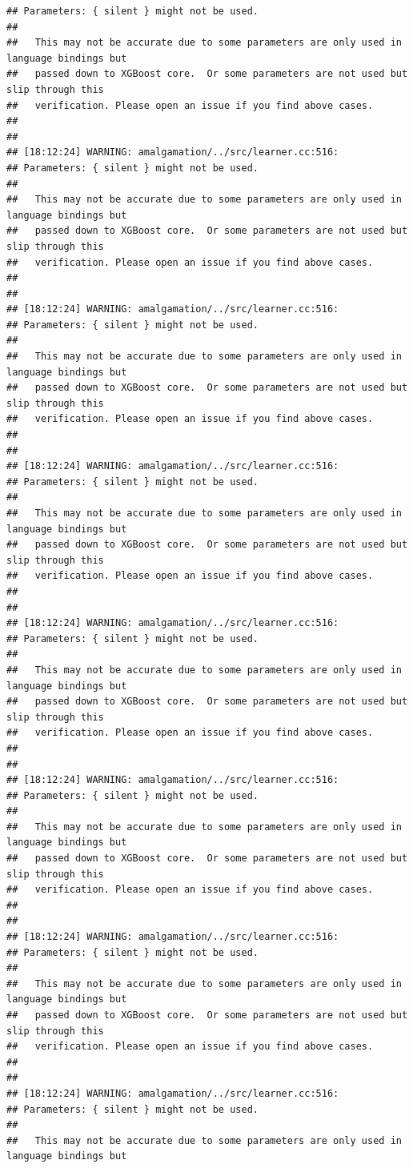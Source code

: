 \documentclass[AMS,STIX2COL]{WileyNJD-v2}\usepackage[]{graphicx}\usepackage[]{color}
\makeatletter
\newenvironment{kframe}{%
 \def\at@end@of@kframe{}%
 \ifinner\ifhmode%
  \def\at@end@of@kframe{\end{minipage}}%
  \begin{minipage}{\columnwidth}%
 \fi\fi%
 \def\FrameCommand##1{\hskip\@totalleftmargin \hskip-\fboxsep
 \colorbox{shadecolor}{##1}\hskip-\fboxsep
     \hskip-\linewidth \hskip-\@totalleftmargin \hskip\columnwidth}%
 \MakeFramed {\advance\hsize-\width
   \@totalleftmargin\z@ \linewidth\hsize
   \@setminipage}}%
 {\par\unskip\endMakeFramed%
 \at@end@of@kframe}
\newenvironment{knitrout}{}{} %
\makeatother
\begin{document}
\begin{knitrout}
\begin{kframe}
\begin{verbatim}
## Parameters: { silent } might not be used.
## 
##   This may not be accurate due to some parameters are only used in language bindings but
##   passed down to XGBoost core.  Or some parameters are not used but slip through this
##   verification. Please open an issue if you find above cases.
## 
## 
## [18:12:24] WARNING: amalgamation/../src/learner.cc:516: 
## Parameters: { silent } might not be used.
## 
##   This may not be accurate due to some parameters are only used in language bindings but
##   passed down to XGBoost core.  Or some parameters are not used but slip through this
##   verification. Please open an issue if you find above cases.
## 
## 
## [18:12:24] WARNING: amalgamation/../src/learner.cc:516: 
## Parameters: { silent } might not be used.
## 
##   This may not be accurate due to some parameters are only used in language bindings but
##   passed down to XGBoost core.  Or some parameters are not used but slip through this
##   verification. Please open an issue if you find above cases.
## 
## 
## [18:12:24] WARNING: amalgamation/../src/learner.cc:516: 
## Parameters: { silent } might not be used.
## 
##   This may not be accurate due to some parameters are only used in language bindings but
##   passed down to XGBoost core.  Or some parameters are not used but slip through this
##   verification. Please open an issue if you find above cases.
## 
## 
## [18:12:24] WARNING: amalgamation/../src/learner.cc:516: 
## Parameters: { silent } might not be used.
## 
##   This may not be accurate due to some parameters are only used in language bindings but
##   passed down to XGBoost core.  Or some parameters are not used but slip through this
##   verification. Please open an issue if you find above cases.
## 
## 
## [18:12:24] WARNING: amalgamation/../src/learner.cc:516: 
## Parameters: { silent } might not be used.
## 
##   This may not be accurate due to some parameters are only used in language bindings but
##   passed down to XGBoost core.  Or some parameters are not used but slip through this
##   verification. Please open an issue if you find above cases.
## 
## 
## [18:12:24] WARNING: amalgamation/../src/learner.cc:516: 
## Parameters: { silent } might not be used.
## 
##   This may not be accurate due to some parameters are only used in language bindings but
##   passed down to XGBoost core.  Or some parameters are not used but slip through this
##   verification. Please open an issue if you find above cases.
## 
## 
## [18:12:24] WARNING: amalgamation/../src/learner.cc:516: 
## Parameters: { silent } might not be used.
## 
##   This may not be accurate due to some parameters are only used in language bindings but

\end{verbatim}
\end{kframe}
\end{knitrout}
\end{document}
